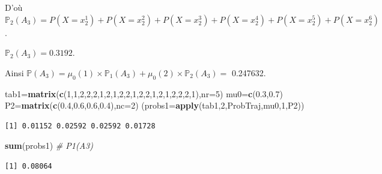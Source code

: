 \documentclass[
]{book}
\newenvironment{Shaded}{\begin{snugshade}}{\end{snugshade}}
\newcommand{\CommentTok}[1]{\textcolor[rgb]{0.56,0.35,0.01}{\textit{#1}}}
\newcommand{\DataTypeTok}[1]{\textcolor[rgb]{0.13,0.29,0.53}{#1}}
\newcommand{\DecValTok}[1]{\textcolor[rgb]{0.00,0.00,0.81}{#1}}
\newcommand{\FloatTok}[1]{\textcolor[rgb]{0.00,0.00,0.81}{#1}}
\newcommand{\KeywordTok}[1]{\textcolor[rgb]{0.13,0.29,0.53}{\textbf{#1}}}
\newcommand{\NormalTok}[1]{#1}
\theoremstyle{definition}
\theoremstyle{definition}
\theoremstyle{definition}
\theoremstyle{remark}
\begin{document}
D'où \(\mathbb{P}_2(A_3)=P(X=x_2^1)+P(X=x_2^2)+P(X=x_2^3)+P(X=x_2^4)+P(X=x_2^5)+P(X=x_2^6)\).

\(\mathbb{P}_2(A_3)=0.3192\).

Ainsi \(\mathbb{P}(A_3)=\mu_0(1)\times \mathbb{P}_1(A_3)+\mu_0(2)\times \mathbb{P}_2(A_3)=\) 0.247632.

\begin{Shaded}
\begin{Highlighting}[]
\NormalTok{tab1=}\KeywordTok{matrix}\NormalTok{(}\KeywordTok{c}\NormalTok{(}\DecValTok{1}\NormalTok{,}\DecValTok{1}\NormalTok{,}\DecValTok{2}\NormalTok{,}\DecValTok{2}\NormalTok{,}\DecValTok{2}\NormalTok{,}\DecValTok{1}\NormalTok{,}\DecValTok{2}\NormalTok{,}\DecValTok{1}\NormalTok{,}\DecValTok{2}\NormalTok{,}\DecValTok{2}\NormalTok{,}\DecValTok{1}\NormalTok{,}\DecValTok{2}\NormalTok{,}\DecValTok{2}\NormalTok{,}\DecValTok{1}\NormalTok{,}\DecValTok{2}\NormalTok{,}\DecValTok{1}\NormalTok{,}\DecValTok{2}\NormalTok{,}\DecValTok{2}\NormalTok{,}\DecValTok{2}\NormalTok{,}\DecValTok{1}\NormalTok{),}\DataTypeTok{nr=}\DecValTok{5}\NormalTok{)}
\NormalTok{mu0=}\KeywordTok{c}\NormalTok{(}\FloatTok{0.3}\NormalTok{,}\FloatTok{0.7}\NormalTok{)}
\NormalTok{P2=}\KeywordTok{matrix}\NormalTok{(}\KeywordTok{c}\NormalTok{(}\FloatTok{0.4}\NormalTok{,}\FloatTok{0.6}\NormalTok{,}\FloatTok{0.6}\NormalTok{,}\FloatTok{0.4}\NormalTok{),}\DataTypeTok{nc=}\DecValTok{2}\NormalTok{)}
\NormalTok{(}\DataTypeTok{probs1=}\KeywordTok{apply}\NormalTok{(tab1,}\DecValTok{2}\NormalTok{,ProbTraj,mu0,}\DecValTok{1}\NormalTok{,P2))}
\end{Highlighting}
\end{Shaded}

\begin{verbatim}
[1] 0.01152 0.02592 0.02592 0.01728
\end{verbatim}

\begin{Shaded}
\begin{Highlighting}[]
\KeywordTok{sum}\NormalTok{(probs1)    }\CommentTok{# P1(A3)}
\end{Highlighting}
\end{Shaded}

\begin{verbatim}
[1] 0.08064
\end{verbatim}
\end{document}
